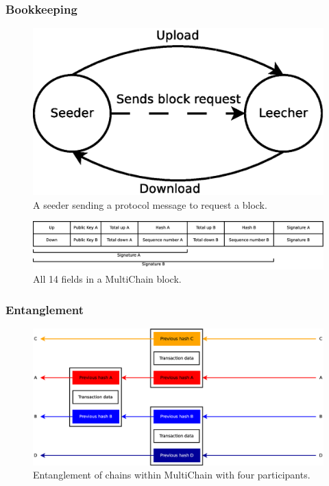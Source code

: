 \documentclass{beamer}
\begin{document}
\begin{frame}
\frametitle{Bookkeeping}

\begin{figure}
	\centerline{\includegraphics[scale=0.2]{images/design/seeder-downloader.eps}}
	\caption{A seeder sending a protocol message to request a block.}
	\label{fig:seeder-downloader}
\end{figure}

\begin{figure}
	\centerline{\includegraphics[scale=0.25]{images/design/signatures.eps}}
	\caption{All 14 fields in a MultiChain block.}
	\label{fig:block}
\end{figure}

\end{frame}

\begin{frame}
\frametitle{Entanglement}

\begin{figure}
	\centerline{\includegraphics[scale=0.25]{images/design/entangled-chain.eps}}
	\caption{Entanglement of chains within MultiChain with four participants.}
	\label{fig:chain-example}
\end{figure}
\end{frame}
\end{document}
